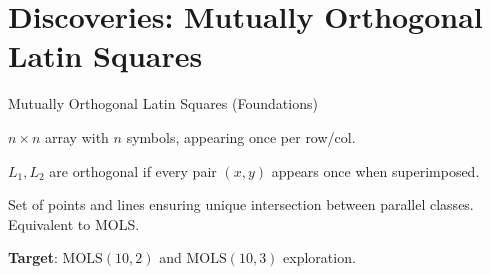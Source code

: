 \documentclass[10pt, aspectratio=169]{beamer}
\begin{document}
\section{Discoveries: Mutually Orthogonal Latin Squares}

\begin{frame}{Mutually Orthogonal Latin Squares (Foundations)}
    \begin{definition}
    $n \times n$ array with $n$ symbols, appearing once per row/col.
    \end{definition}
    
    \begin{definition}[MOLS]
    $L_1, L_2$ are orthogonal if every pair $(x,y)$ appears once when superimposed.
    \end{definition}

    \begin{definition}[$k$-net]
    Set of points and lines ensuring unique intersection between parallel classes. Equivalent to MOLS.
    \end{definition}

    \vspace{0.3cm}
    \textbf{Target}: $\text{MOLS}(10,2)$ and $\text{MOLS}(10,3)$ exploration.
\end{frame}
\end{document}

